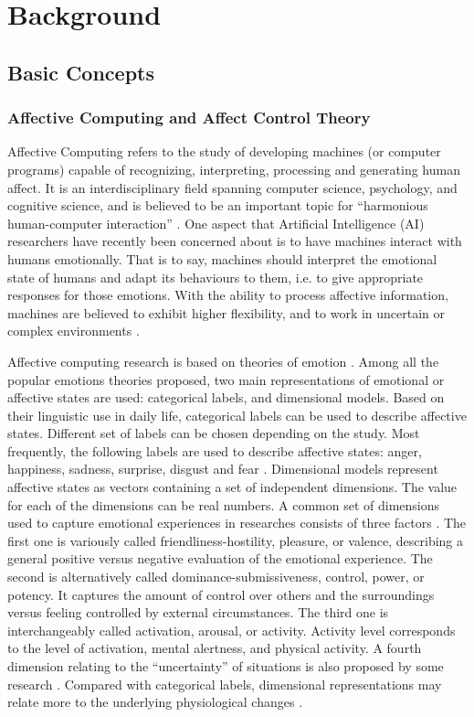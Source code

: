 \chapter{Background}
\label{chap:bg}

\section{Basic Concepts}
\label{sec:concepts}
\subsection{Affective Computing and Affect Control Theory}

Affective Computing refers to the study of developing machines (or computer programs) capable of recognizing, interpreting, processing and generating human affect. It is an interdisciplinary field spanning computer science, psychology, and cognitive science, and is believed to be an important topic for ``harmonious human-computer interaction'' \cite{tao2005affective}. One aspect that Artificial Intelligence (AI) researchers have recently been concerned about is to have machines interact with humans emotionally. That is to say, machines should interpret the emotional state of humans and adapt its behaviours to them, i.e. to give appropriate responses for those emotions. With the ability to process affective information, machines are believed to exhibit higher flexibility, and to work in uncertain or complex environments \cite{picard2000affective}.

Affective computing research is based on theories of emotion \cite{lewis2010handbook}. Among all the popular emotions theories proposed, two main representations of emotional or affective states are used: categorical labels, and dimensional models. Based on their linguistic use in daily life, categorical labels can be used to describe affective states. Different set of labels can be chosen depending on the study. Most frequently, the following labels are used to describe affective states: anger, happiness, sadness, surprise, disgust and fear \cite{ekman1992there}. Dimensional models represent affective states as vectors containing a set of independent dimensions. The value for each of the dimensions can be real numbers. A common set of dimensions used to capture emotional experiences in researches consists of three factors \cite{scholl2013socio}. The first one is variously called friendliness-hostility, pleasure, or valence, describing a general positive versus negative evaluation of the emotional experience. The second is alternatively called dominance-submissiveness, control, power, or potency. It captures the amount of control over others and the surroundings versus feeling controlled by external circumstances. The third one is interchangeably called activation, arousal, or activity. Activity level corresponds to the level of activation, mental alertness, and physical activity. A fourth dimension relating to the ``uncertainty'' of situations is also proposed by some research \cite{fontaine2007world}.  Compared with categorical labels, dimensional representations may relate more to the underlying physiological changes \cite{mauss2009measures}.

